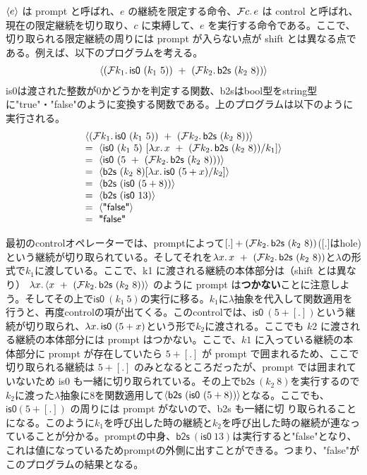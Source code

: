 $\langle{e}\rangle$ は prompt と呼ばれ、$e$ の継続を限定する命令、${\cal F}{c}.\,{e}$ は control と呼ばれ、現在の限定継続を切り取り、$c$ に束縛して、$e$ を実行する命令である。ここで、切り取られる限定継続の周りには prompt が入らない点が shift とは異なる点である。例えば、以下のプログラム\cite{FSCD2021}を考える。
\[
\begin{array}{c}
  \Prompt{(\Control{k_1}{\textsf{is0}\ (k_1\ 5)})\ +\ (\Control{k_2}{\textsf{b2s}\ (k_2\ 8)})}
\end{array}
\]
\textsf{is0}は渡された整数が0かどうかを判定する関数、\textsf{b2s}はbool型をstring型に\textsf{"true"}・\textsf{"false"}のように変換する関数である。上のプログラムは以下のように実行される。
\[
\begin{array}{l}
  \Prompt{(\Control{k_1}{\textsf{is0}\ (k_1\ 5)})\ +\ (\Control{k_2}{\textsf{b2s}\ (k_2\ 8)})}\\
  =\ \Prompt{\textsf{is0}\ (k_1\ 5)\ [\Lam{x}{x}\ +\ (\Control{k_2}{\textsf{b2s}\ (k_2\ 8)})/k_1]}\\
  =\ \Prompt{\textsf{is0}\ (5\ +\ (\Control{k_2}{\textsf{b2s}\ (k_2\ 8)}))}\\
  =\ \Prompt{\textsf{b2s}\ (k_2\ 8)[\Lam{x}{\textsf{is0}\ (5 + x)}/k_2]}\\
  =\ \Prompt{\textsf{b2s}\ (\textsf{is0}\ (5+8))}\\
  =\ \Prompt{\textsf{b2s}\ (\textsf{is0}\ 13)}\\
  =\ \Prompt{\textsf{"false"}}\\
  =\ \textsf{"false"}
\end{array}
\]

最初のcontrolオペレーターでは、promptによって$[.]+(\Control{k_2}{\textsf{b2s}\ (k_2\ 8)})$([.]はhole)という継続が切り取られている。そしてそれを$\Lam{x}{x}\ +\ (\Control{k_2}{\textsf{b2s}\ (k_2\ 8)})$と$\lambda$の形式で$k_1$に渡している。ここで、k1 に渡される継続の本体部分は（shift とは異なり）
  $\Lam{x}{\langle x}\ +\ (\Control{k_2}{\textsf{b2s}\ (k_2\ 8)})\rangle$ のように prompt は\textbf{つかない}ことに注意しよう。そしてその上で$\textsf{is0}\ (k_1\ 5)$の実行に移る。$k_1$に$\lambda$抽象を代入して関数適用を行うと、再度controlの項が出てくる。このcontrolでは、$\textsf{is0}\ (5 + [.])$という継続が切り取られ、$\lambda{x}.\,{\textsf{is0}\ (5 + x)}$という形で$k_2$に渡される。ここでも $k2$ に渡される継続の本体部分には prompt はつかない。ここで、$k1$ に入っている継続の本体部分に prompt が存在していたら $5+[.]$ が prompt で囲まれるため、ここで切り取られる継続は $5+[.]$ のみとなるところだったが、prompt では囲まれていないため \textsf{is0} も一緒に切り取られている。その上で$\textsf{b2s}\ (k_2\ 8)$を実行するので$k_2$に渡った$\lambda$抽象に8を関数適用して$\Prompt{\textsf{b2s}\ (\textsf{is0}\ (5+8))}$となる。ここでも、$\textsf{is0} (5 + [.])$ の周りには prompt がないので、\textsf{b2s} も一緒に切
り取られることになる。このように$k_1$を呼び出した時の継続と$k_2$を呼び出した時の継続が連なっていることが分かる。promptの中身、$\textsf{b2s}\ (\textsf{is0}\ 13)$は実行すると\textsf{"false"}となり、これは値になっているためpromptの外側に出すことができる。つまり、\textsf{"false"}がこのプログラムの結果となる。

